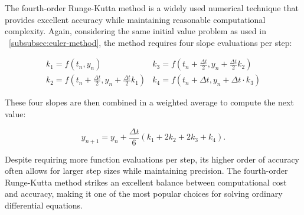 The fourth-order Runge-Kutta method is a widely used numerical technique that provides excellent accuracy while maintaining reasonable computational complexity.
Again, considering the same initial value problem as used in ~\ref{subsubsec:euler-method}, the method requires four slope evaluations per step:

\[
\begin{array}{ll}
k_1 = f(t_n, y_n) &
k_3 = f\left(t_n + \frac{\Delta t}{2}, y_n + \frac{\Delta t}{2}k_2\right) \\[4pt]
k_2 = f\left(t_n + \frac{\Delta t}{2}, y_n + \frac{\Delta t}{2}k_1\right) &
k_4 = f\left(t_n + \Delta t, y_n + \Delta t \cdot k_3\right)
\end{array}
\]

These four slopes are then combined in a weighted average to compute the next value:

\[
y_{n+1} = y_n + \frac{\Delta t}{6}(k_1 + 2k_2 + 2k_3 + k_4).
\]

Despite requiring more function evaluations per step, its higher order of accuracy often allows for larger step sizes while maintaining precision.
The fourth-order Runge-Kutta method strikes an excellent balance between computational cost and accuracy, making it one of the most popular choices for solving ordinary differential equations.